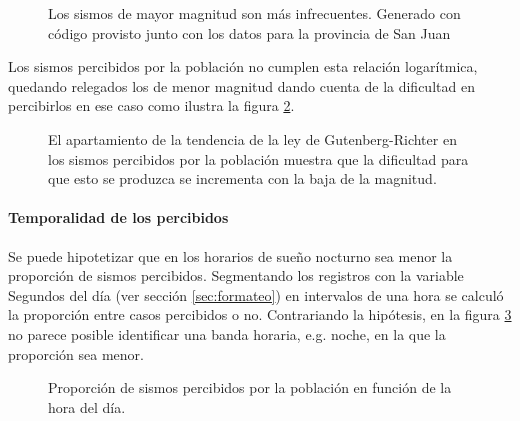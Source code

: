 \documentclass[a4paper]{report}
\begin{document}
\begin{figure}[!ht]
\centering

\vspace{-0.8cm}
\caption{Los sismos de mayor magnitud son más infrecuentes. Generado con código provisto junto con los datos para la provincia de San Juan \cite[sección 4.2.1]{daniela_parada_ic-datasets-docencia_nodate}}
\label{fig:acumulado_anual_magnitud}
\end{figure}

Los sismos percibidos por la población no cumplen esta relación logarítmica, quedando relegados los de menor magnitud dando cuenta de la dificultad en percibirlos en ese caso como ilustra la figura \ref{fig:acumulado_anual_magnitud_percibidos}.
\begin{figure}[!ht]
\centering

\vspace{-0.8cm}
\caption{El apartamiento de la tendencia de la ley de Gutenberg-Richter en los sismos percibidos por la población muestra que la dificultad para que esto se produzca se incrementa con la baja de la magnitud.}
\label{fig:acumulado_anual_magnitud_percibidos}
\end{figure}



\paragraph{Temporalidad de los percibidos}\label{sec:temporal}
Se puede hipotetizar que en los horarios de sueño nocturno sea menor la proporción de sismos percibidos.
Segmentando los registros con la variable Segundos del día (ver sección \ref{sec:formateo}) en intervalos de una hora se calculó la proporción entre casos percibidos o no.
Contrariando la hipótesis, en la figura \ref{fig:histograma_percibidos_por_hora} no parece posible identificar una banda horaria, e.g. noche, en la que la proporción sea menor.

\begin{figure}[!ht]
\centering

\vspace{-0.8cm}
\caption{Proporción de sismos percibidos por la población en función de la hora del día.}
\label{fig:histograma_percibidos_por_hora}
\end{figure}
\end{document}
